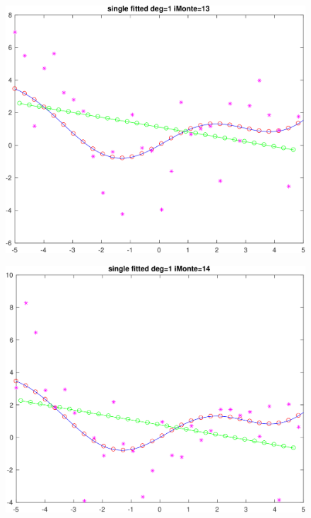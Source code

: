 \documentclass[11pt]{article}
\begin{document}
\begin{figure}[h!]
\centering\includegraphics[scale=0.1]{single_poly_d_1_iMonte_13.png}
\end{figure}


\begin{figure}[h!]
\centering\includegraphics[scale=0.1]{single_poly_d_1_iMonte_14.png}
\end{figure}
\end{document}
